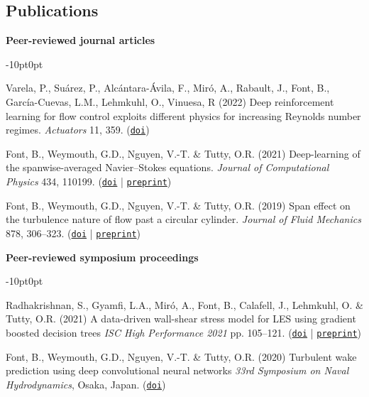 \documentclass[line]{res}
\newenvironment{p}
  {\begin{adjustwidth}{-10pt}{0pt}}
  {\end{adjustwidth}}
\begin{document}
\begin{resume}
\section{Publications}
\vspace{0.25cm}
\hspace{-1cm}\textbf{Peer-reviewed journal articles}\vspace{0.25cm}
\begin{p}
\begin{etaremune}[leftmargin=-2pt,parsep=5pt]
\item Varela, P., Suárez, P., Alcántara-Ávila, F., Miró, A., Rabault, J., Font, B., García-Cuevas, L.M., Lehmkuhl, O., Vinuesa, R (2022) Deep reinforcement learning for flow control exploits different physics for increasing Reynolds number regimes. \textit{Actuators} 11, 359. (\href{https://doi.org/10.3390/act11120359}{\texttt{doi}})
\item Font, B., Weymouth, G.D., Nguyen, V.-T. \& Tutty, O.R. (2021) Deep-learning of the spanwise-averaged Navier--Stokes equations. \textit{Journal of Computational Physics} 434, 110199. (\href{https://doi.org/10.1016/j.jcp.2021.110199}{\texttt{doi}} | \href{https://arxiv.org/abs/2008.07528}{\texttt{preprint}})
\item Font, B., Weymouth, G.D., Nguyen, V.-T. \& Tutty, O.R. (2019) Span effect on the turbulence nature of flow past a circular cylinder. \textit{Journal of Fluid Mechanics} 878, 306--323. (\href{https://doi.org/10.1017/jfm.2019.637}{\texttt{doi}} | \href{https://arxiv.org/abs/2008.08933}{\texttt{preprint}})
\end{etaremune}
\end{p}

\newpage


\hspace{-1cm}\textbf{Peer-reviewed symposium proceedings}\vspace{0.25cm}
\begin{p}
\begin{etaremune}[leftmargin=-2pt,parsep=5pt]
\item Radhakrishnan, S., Gyamfi, L.A., Mir\'{o}, A., Font, B., Calafell, J., Lehmkuhl, O. \& Tutty, O.R. (2021) A data-driven wall-shear stress model for LES using gradient boosted decision trees \textit{ISC High Performance 2021} pp. 105--121. (\href{https://doi.org/10.1007/978-3-030-90539-2_7}{\texttt{doi}} | \href{https://upcommons.upc.edu/bitstream/handle/2117/358666/Manuscript_isc2021.pdf?sequence=3}{\texttt{preprint}})
\item Font, B., Weymouth, G.D., Nguyen, V.-T. \& Tutty, O.R. (2020) Turbulent wake prediction using deep convolutional neural networks \textit{33rd Symposium on Naval Hydrodynamics}, Osaka, Japan. (\href{https://eprints.soton.ac.uk/444591/}{\texttt{doi}})
\end{etaremune}
\end{p}


\end{resume}
\end{document}
